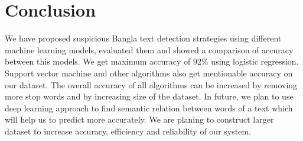 \section{\textbf{Conclusion}}
We have proposed suspicious Bangla text detection strategies using different machine learning models, evaluated them and showed a comparison of accuracy between this models. We get maximum accuracy of 92$\%$ using logistic regression. Support vector machine and other algorithms also get mentionable accuracy on our dataset. The overall accuracy of all algorithms can be increased by removing more stop words and by increasing size of the dataset. In future, we plan to use deep learning approach to find semantic relation between words of a text which will help us to predict more accurately. We are planing to construct larger dataset to increase accuracy, efficiency and reliability of our system.